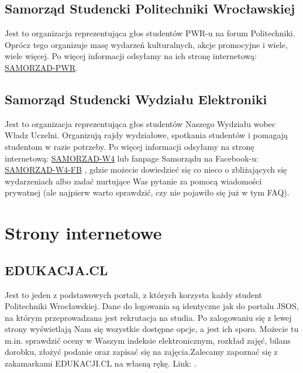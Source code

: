 \documentclass[11pt]{article}
\begin{document}
\subsection{Samorząd Studencki Politechniki Wrocławskiej}
\indent \hspace{0.5cm} Jest to organizacja reprezentująca głos studentów PWR-u na forum Politechniki. Oprócz tego organizuje masę wydarzeń kulturalnych, akcje promocyjne i wiele, wiele więcej. Po więcej informacji odsyłamy na ich stronę internetową:
{\color{blue}\href{https://samorzad.pwr.edu.pl/}{SAMORZAD-PWR}}.

\subsection{Samorząd Studencki Wydziału Elektroniki}

\indent \hspace{0.5cm} Jest to organizacja reprezentująca głos studentów Naszego Wydziału wobec Władz Uczelni. Organizują rajdy wydziałowe, spotkania studentów i pomagają studentom w razie potrzeby. Po więcej informacji odsyłamy na stronę internetową:
{\color{blue}\href{https://samorzad.pwr.edu.pl/w4}{SAMORZAD-W4}}
lub fanpage Samorządu na Facebook-u: 
{\color{blue}\href{https://www.facebook.com/samorzad.eka/?_rdc=1&_rdr}{SAMORZAD-W4-FB}}
, gdzie możecie dowiedzieć się co nieco o zbliżających się wydarzeniach albo zadać nurtujące Was pytanie za pomocą wiadomości prywatnej (ale najpierw warto sprawdzić, czy nie pojawiło się już w tym FAQ).

\newpage
\section{Strony internetowe}
\subsection{EDUKACJA.CL}
\indent \hspace{0.5cm} Jest to jeden z podstawowych portali, z których korzysta każdy student Politechniki Wrocławskiej. Dane do logowania są identyczne jak do portalu JSOS, na którym przeprowadzana jest rekrutacja na studia. Po zalogowaniu się z lewej strony wyświetlają Nam się wszystkie dostępne opcje, a jest ich sporo. Możecie tu m.in. sprawdzić oceny w Waszym indeksie elektronicznym, rozkład zajęć, bilans dorobku, złożyć podanie oraz zapisać się na zajęcia.\linebreak Zalecamy zapoznać się z zakamarkami EDUKACJI.CL na własną rękę. Link: {}.
\end{document}
